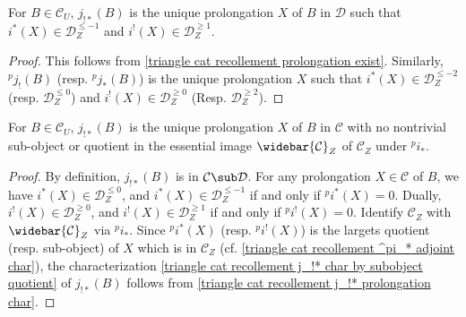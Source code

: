 \begin{corollary}\label{triangle cat recollement j_!* prolongation char}
For $B\in\mathcal{C}_U$, $j_{!*}(B)$ is the unique prolongation $X$ of $B$ in $\mathcal{D}$ such that $i^*(X)\in\mathcal{D}_Z^{\leq -1}$ and $i^!(X)\in\mathcal{D}_Z^{\geq 1}$.
\end{corollary}
\begin{proof}
This follows from \cref{triangle cat recollement prolongation exist}. Similarly, ${^pj_!}(B)$ (resp. ${^pj_*}(B)$) is the unique prolongation $X$ such that $i^*(X)\in\mathcal{D}_Z^{\leq -2}$ (resp. $\mathcal{D}_Z^{\leq 0}$) and $i^!(X)\in\mathcal{D}_Z^{\geq 0}$ (Resp. $\mathcal{D}_Z^{\geq 2}$).
\end{proof}

\begin{corollary}\label{triangle cat recollement j_!* char by subobject quotient}
For $B\in\mathcal{C}_U$, $j_{!*}(B)$ is the unique prolongation $X$ of $B$ in $\mathcal{C}$ with no nontrivial sub-object or quotient in the essential image $\widebar{\mathcal{C}}_Z$ of $\mathcal{C}_Z$ under ${^pi}_*$.
\end{corollary}
\begin{proof}
By definition, $j_{!*}(B)$ is in $\mathcal{C}\sub\mathcal{D}$. For any prolongation $X\in\mathcal{C}$ of $B$, we have $i^*(X)\in\mathcal{D}_Z^{\leq 0}$, and $i^*(X)\in\mathcal{D}_Z^{\leq -1}$ if and only if ${^pi^*}(X)=0$. Dually, $i^!(X)\in\mathcal{D}_Z^{\geq 0}$, and $i^!(X)\in\mathcal{D}_Z^{\geq 1}$ if and only if ${^pi^!}(X)=0$. Identify $\mathcal{C}_Z$ with $\widebar{\mathcal{C}}_Z$ via ${^pi_*}$. Since ${^pi^*}(X)$ (resp. ${^pi^!}(X)$) is the largets quotient (resp. sub-object) of $X$ which is in $\mathcal{C}_Z$ (cf. \cref{triangle cat recollement ^pi_* adjoint char}), the characterization \cref{triangle cat recollement j_!* char by subobject quotient} of $j_{!*}(B)$ follows from \cref{triangle cat recollement j_!* prolongation char}.
\end{proof}

